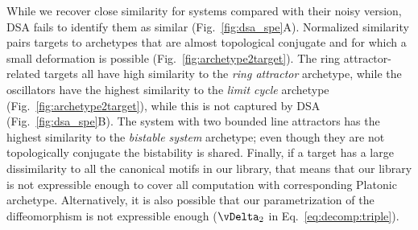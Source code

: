 \documentclass{article}
\theoremstyle{definition} \newtheorem{definition}{Definition}  \newtheorem{example}{Example}
\theoremstyle{remark} \newtheorem{remark}{Remark}
\newcounter{ct}
\begin{document}
While we recover close similarity for systems compared with their noisy version, DSA fails to identify them as similar (Fig.~\ref{fig:dsa_spe}A).
Normalized similarity pairs targets to archetypes that are almost topological conjugate and for which a small deformation is possible (Fig.~\ref{fig:archetype2target}). 
The ring attractor-related targets all have high similarity to the \emph{ring attractor} archetype, while the oscillators have the highest similarity to the \emph{limit cycle} archetype (Fig.~\ref{fig:archetype2target}), while this is not captured by DSA (Fig.~\ref{fig:dsa_spe}B). 
The system with two bounded line attractors has the highest similarity to the \emph{bistable system} archetype; even though they are not topologically conjugate the bistability is shared.
Finally, if a target has a large dissimilarity to all the canonical motifs in our library, that means that our library is not expressible enough to cover all computation with corresponding Platonic archetype.
Alternatively, it is also possible that our parametrization of the diffeomorphism is not expressible enough ($\vDelta_2$ in Eq.~\ref{eq:decomp:triple}).





\end{document}
